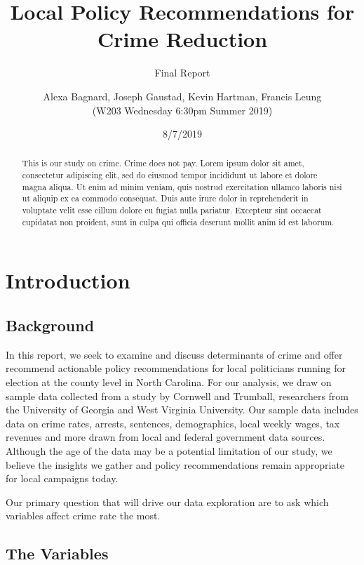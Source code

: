 \documentclass[]{article}
\title{Local Policy Recommendations for Crime Reduction}
\subtitle{Final Report}
\author{Alexa Bagnard, Joseph Gaustad, Kevin Hartman, Francis Leung \\ (W203 Wednesday 6:30pm Summer 2019)}
\date{8/7/2019}
\begin{document}
\maketitle
\begin{abstract}
This is our study on crime. Crime does not pay. Lorem ipsum dolor sit
amet, consectetur adipiscing elit, sed do eiusmod tempor incididunt ut
labore et dolore magna aliqua. Ut enim ad minim veniam, quis nostrud
exercitation ullamco laboris nisi ut aliquip ex ea commodo consequat.
Duis aute irure dolor in reprehenderit in voluptate velit esse cillum
dolore eu fugiat nulla pariatur. Excepteur sint occaecat cupidatat non
proident, sunt in culpa qui officia deserunt mollit anim id est laborum.
\end{abstract}

{
\setcounter{tocdepth}{2}
\tableofcontents
}
\hypertarget{introduction}{%
\section{Introduction}\label{introduction}}

\hypertarget{background}{%
\subsection{Background}\label{background}}

In this report, we seek to examine and discuss determinants of crime and
offer recommend actionable policy recommendations for local politicians
running for election at the county level in North Carolina. For our
analysis, we draw on sample data collected from a study by Cornwell and
Trumball, researchers from the University of Georgia and West Virginia
University. Our sample data includes data on crime rates, arrests,
sentences, demographics, local weekly wages, tax revenues and more drawn
from local and federal government data sources. Although the age of the
data may be a potential limitation of our study, we believe the insights
we gather and policy recommendations remain appropriate for local
campaigns today.

Our primary question that will drive our data exploration are to ask
which variables affect crime rate the most.

\hypertarget{the-variables}{%
\subsection{The Variables}\label{the-variables}}
\end{document}

